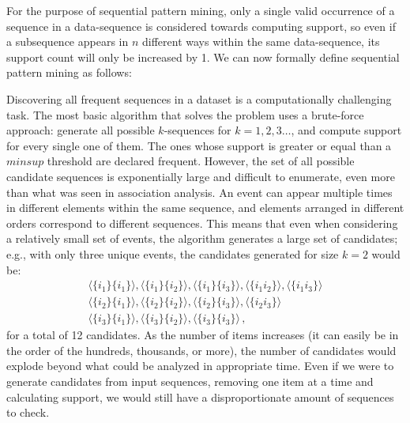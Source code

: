 
For the purpose of sequential pattern mining, only a single valid occurrence of a sequence in a data-sequence is considered towards computing support, so even if a subsequence appears in $n$ different ways within the same data-sequence, its support count will only be increased by 1. We can now formally define sequential pattern mining as follows:

Discovering all frequent sequences in a dataset is a computationally challenging task. The most basic algorithm that solves the problem uses a brute-force approach: generate all possible $k$-sequences for $k = 1,2,3 \ldots$, and compute support for every single one of them. The ones whose support is greater or equal than a $minsup$ threshold are declared frequent. However, the set of all possible candidate sequences is exponentially large and difficult to enumerate, even more than what was seen in association analysis. An event can appear multiple times in different elements within the same sequence, and elements arranged in different orders correspond to different sequences. This means that even when considering a relatively small set of events, the algorithm generates a large set of candidates; e.g., with only three unique events, the candidates generated for size $k = 2$ would be:
\begin{gather*}
    \langle\{i_1\} \{i_1\}\rangle, \langle\{i_1\} \{i_2\}\rangle, \langle\{i_1\} \{i_3\}\rangle, \langle\{i_1 i_2\}\rangle, \langle\{i_1 i_3\}\rangle \\ 
    \langle\{i_2\} \{i_1\}\rangle, \langle\{i_2\} \{i_2\}\rangle, \langle\{i_2\} \{i_3\}\rangle, \langle\{i_2 i_3\}\rangle \\
    \langle\{i_3\} \{i_1\}\rangle, \langle\{i_3\} \{i_2\}\rangle, \langle\{i_3\} \{i_3\}\rangle \,,
\end{gather*}
for a total of 12 candidates. As the number of items increases (it can easily be in the order of the hundreds, thousands, or more), the number of candidates would explode beyond what could be analyzed in appropriate time. Even if we were to generate candidates from input sequences, removing one item at a time and calculating support, we would still have a disproportionate amount of sequences to check.

